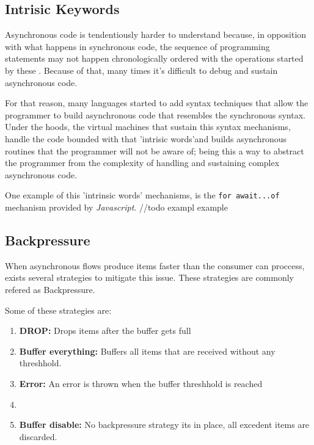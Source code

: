 	\begin{figure}[H]
		\centering
		\begin{subfigure}[h]{1.2\textwidth}
			\centering
			\caption{}
		\end{subfigure}
	\end{figure}
	
	\clearpage
    
	\subsection{Intrisic Keywords} 
	
	Asynchronous code is tendentiously harder to understand because, in opposition with what happens in synchronous code, the sequence of programming statements may not happen chronologically ordered with the operations started by these . 
	Because of that, many times it's difficult to debug and sustain asynchronous code. 

	For that reason, many languages started to add syntax techniques that allow the programmer to build asynchronous code that resembles the synchronous syntax.
	Under the hoods, the virtual machines that sustain this syntax mechanisms, handle the code bounded with that 'intrisic words'and builds asynchronous routines that the programmer will not be aware of;
	being this a way to abstract the programmer from the complexity of handling and sustaining complex asynchronous code. 

	One example of this 'intrinsic words' mechanisms, is the \texttt{for await...of} mechanism provided by \textit{Javascript}. //todo exampl example 


	\subsection{Backpressure} 
	
	When asynchronous flows produce  items faster than the consumer can proccess, exists several strategies to mitigate this issue. These strategies are commonly refered as Backpressure.

	Some of these strategies are:
	\begin{enumerate}
		\item \textbf{DROP:} Drops items after the buffer gets full
		\item \textbf{Buffer everything:} Buffers all items that are received without any threshhold.
		\item \textbf{Error:} An error is thrown when the buffer threshhold is reached
		\item \item \textbf{Buffer disable:} No backpressure strategy its in place, all excedent items are discarded.
	\end{enumerate}
    

